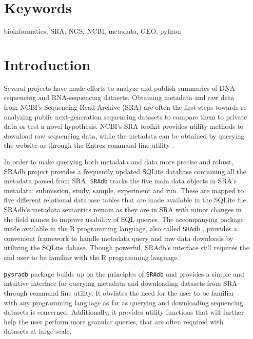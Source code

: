 \documentclass[9pt,a4paper]{extarticle}
\begin{document}
\section*{Keywords}
bioinformatics, SRA, NGS, NCBI, metadata, GEO, python



\clearpage
\pagestyle{main}
\section*{Introduction}
Several projects have made efforts to analyze and publish summaries of DNA-
sequencing \cite{macarthur2012systematic} and RNA-sequencing
\cite{lachmann2018massive, collado2017reproducible} datasets. Obtaining metadata
and raw data from NCBI's Sequencing Read Archive (SRA) \cite{leinonen2010sequence}
are often the first steps towards re-analyzing public next-generation sequencing 
datasets to compare them to private data or test a novel hypothesis. NCBI's SRA
toolkit \cite{ncbisratoolit} provides utility methods to download raw sequencing
data, while the metadata can be obtained by querying the website or through the
Entrez command line utility 
\cite{kans2018entrez}.

In order to make querying both metadata and data more precise and robust, SRAdb
\cite{zhu2013sradb} project provides a frequently updated SQLite database 
containing all the metadata parsed from SRA. \texttt{SRAdb} tracks the five main
data objects in SRA's metadata: submission, study, sample, experiment and run.
These are mapped to five different relational database tables that are made
available in the SQLite file. SRAdb's metadata semantics remain as they are in
SRA with minor changes in the field names to improve usability of SQL queries. 
The accompanying package made available in the R programming language, also
called \texttt{SRAdb} \cite{zhudavissradb}, provides a convenient framework to
handle metadata query and raw data downloads by utilizing the SQLite dabase. 
Though powerful, SRAdb's interface still requires the end user to be familiar 
with the R programming language. 

\texttt{pysradb} package builds up on the principles of \texttt{SRAdb} and 
provides a simple and intuitive interface for querying metadata and downloading
datasets from SRA through command line utility. It obviates the need for the
user to be familiar with any programming language as far as querying and
downloading sequencing datasets is concerned. Additionally, it provides utility 
functions that will further help the user perform more granular queries, that
are often required with datasets at large scale.
\end{document}

